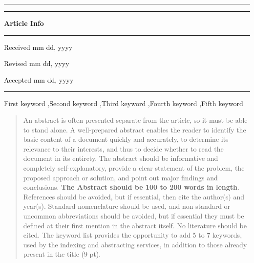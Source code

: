 \documentclass{telkomnika}
\begin{document}
\hrule
\vspace{.1em}
\hrule
\vspace{.5em}
\noindent
\parbox[t][][s]{0.315\textwidth}{%
\textbf{Article Info}
\vspace{.5em}
\hrule
\vspace{.5em}
\begin{history}
\vspace{.5em}

Received mm dd, yyyy

Revised mm dd, yyyy

Accepted mm dd, yyyy

\vspace{.7em}
\end{history}
\vspace{.5em}
\hrule
\vspace{.5em}
\begin{keyword} 
\vspace{.5em}
First keyword \sep Second keyword \sep Third keyword \sep Fourth keyword \sep Fifth keyword
\vspace{.5em}
\end{keyword}
\vspace{\fill}
}
\parbox{0.020\textwidth}{\hspace{.5em}}
\parbox[t][][s]{0.65\textwidth}{%
\begin{abstract}
\vspace{.3em}
An abstract is often presented separate from the article, so it must be able to stand alone. A well-prepared abstract enables the reader to identify the basic content of a document quickly and accurately, to determine its relevance to their interests, and thus to decide whether to read the document in its entirety. The abstract should be informative and completely self-explanatory, provide a clear statement of the problem, the proposed approach or solution, and point out major findings and conclusions. \textbf{The Abstract should be 100 to 200 words in length}. References should be avoided, but if essential, then cite the author(s) and year(s). Standard nomenclature should be used, and non-standard or uncommon abbreviations should be avoided, but if essential they must be defined at their first mention in the abstract itself. No literature should be cited. The keyword list provides the opportunity to add 5 to 7 keywords, used by the indexing and abstracting services, in addition to those already present in the title (9 pt).
\end{abstract}
}
\end{document}
